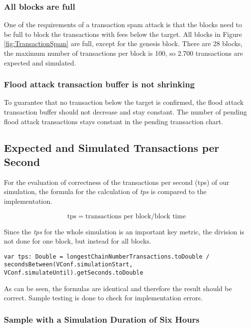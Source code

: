\subsubsection{All blocks are full}
One of the requirements of a transaction spam attack is that the blocks need to be full to block the transactions with fees below the target. All blocks in Figure \ref{fig:TransactionSpam} are full, except for the genesis block. There are 28 blocks, the maximum number of transactions per block is 100, so 2.700 transactions are expected and simulated.

\subsubsection{Flood attack transaction buffer is not shrinking}
To guarantee that no transaction below the target is confirmed, the flood attack transaction buffer should not decrease and stay constant. The number of pending flood attack transactions stays constant in the pending transaction chart.

\subsection{Expected and Simulated Transactions per Second}

For the evaluation of correctness of the transactions per second (tps) of our simulation, the formula for the calculation of \textit{tps} is compared to the implementation.

\begin{equation}
\text{tps} = \text{transactions per block} / \text{block time}
\end{equation}

Since the \textit{tps} for the whole simulation is an important key metric, the division is not done for one block, but instead for all blocks.

\begin{minipage}{\linewidth}
\begin{lstlisting}[style=myScalastyle]
    var tps: Double = longestChainNumberTransactions.toDouble / secondsBetween(VConf.simulationStart, VConf.simulateUntil).getSeconds.toDouble
\end{lstlisting}
\end{minipage}

As can be seen, the formulas are identical and therefore the result should be correct. Sample testing is done to check for implementation errors.

\subsubsection{Sample with a Simulation Duration of Six Hours}

